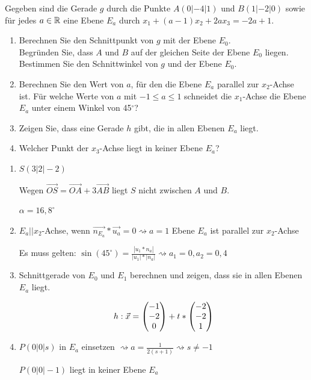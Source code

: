 Gegeben sind die Gerade $g$ durch die Punkte $A(0|-4|1)$ und $B(1|-2|0)$ sowie für jedes $a\in\mathbb{R}$ eine Ebene $E_a$ durch $x_1+(a-1)x_2+2ax_3=-2a+1$.
\begin{enumerate}
  \item Berechnen Sie den Schnittpunkt von $g$ mit der Ebene $E_0$.\\
  Begründen Sie, dass $A$ und $B$ auf der gleichen Seite der Ebene $E_0$ liegen.\\
  Bestimmen Sie den Schnittwinkel von $g$ und der Ebene $E_0$. 

  \item Berechnen Sie den Wert von $a$, für den die Ebene $E_a$ parallel zur $x_2$-Achse ist. Für welche Werte von $a$ mit $-1\leq a\leq 1$ schneidet die $x_1$-Achse die Ebene $E_a$ unter einem Winkel von 45$^\circ$? 

  \item Zeigen Sie, dass eine Gerade $h$ gibt, die in allen Ebenen $E_a$ liegt. 

  \item Welcher Punkt der $x_3$-Achse liegt in keiner Ebene $E_a$? 
\end{enumerate}
\begin{lsg}{}
	\begin{enumerate}
		\item $S(3|2|-2)$

		Wegen $\vec{OS}=\vec{OA}+3\vec{AB}$ liegt $S$ nicht zwischen $A$ und $B$.

		$\alpha = 16,8^\circ$

		\item $E_a || x_2$-Achse, wenn $\vec{n_{E_a}}*\vec{u_a}=0 \rightsquigarrow a=1$ Ebene $E_a$ ist parallel zur $x_2$-Achse

		Es muss gelten: $\sin(45^\circ)=\frac{|u_1*n_a|}{|u_1|*|n_a|} \rightsquigarrow a_1=0, a_2=0,4$

		\item Schnittgerade von $E_0$ und $E_1$ berechnen und zeigen, dass sie in allen Ebenen $E_a$ liegt.

		\begin{equation*}
			h: \vec x=\begin{pmatrix} -1\\-2\\0 \end{pmatrix}+t*\begin{pmatrix} -2\\-2\\1 \end{pmatrix}
		\end{equation*}

		\item $P(0|0|s)$ in $E_a$ einsetzen $\rightsquigarrow a=\frac{1}{2(s+1)} \rightsquigarrow s\not=-1$

		$P(0|0|-1)$ liegt in keiner Ebene $E_a$
	\end{enumerate}
\end{lsg}



